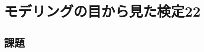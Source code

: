 \documentclass{ltjsbook}
\begin{document}
 
\chapter{モデリングの目から見た検定22}
\label{chapter22} 


\section{課題}
\end{document}
